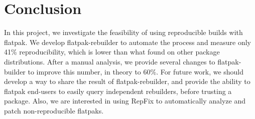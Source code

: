\documentclass[a4paper,11pt,oneside]{report}
\theoremstyle{definition}
\newcommand{\sysname}{flatpak-rebuilder\xspace}
\newcommand{\rb}{reproducible builds\xspace}
\newcommand{\fp}{flatpak\xspace}
\newcommand{\fb}{flatpak-builder\xspace}
\begin{document}
\chapter{Conclusion}

In this project, we investigate the feasibility of using \rb with \fp. We
develop \sysname to automate the process and measure only 41\% reproducibility,
which is lower than what found on other package distributions. After a manual
analysis, we provide several changes to \fb to improve this number, in theory
to 60\%. For future work, we should develop a way to share the result of
\sysname, and provide the ability to \fp end-users to easily query independent
rebuilders, before trusting a package. Also, we are interested in using RepFix
to automatically analyze and patch non-reproducible flatpaks.

\cleardoublepage
{}
{}
\printbibliography
\end{document}
